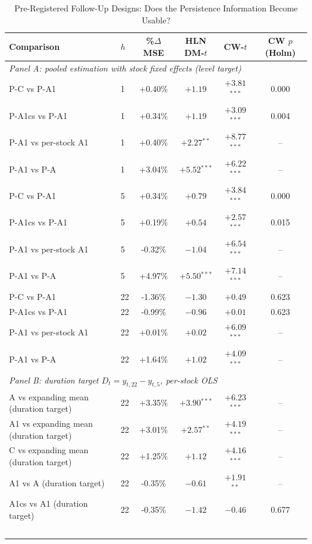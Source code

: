 
\begin{table}[htbp]
\centering
\caption{Pre-Registered Follow-Up Designs: Does the Persistence Information Become Usable?}
\label{tab:candidates}
\small
\begin{tabular}{llcccc}
\toprule
Comparison & $h$ & \%$\Delta$MSE & HLN DM-$t$ & CW-$t$ & CW $p$ (Holm) \\
\midrule
\multicolumn{6}{l}{\textit{Panel A: pooled estimation with stock fixed effects (level target)}} \\
P-C vs P-A1 & 1 & +0.40\% & $+1.19$ & $+3.81$$^{***}$ & 0.000 \\
P-A1cs vs P-A1 & 1 & +0.34\% & $+1.19$ & $+3.09$$^{***}$ & 0.004 \\
P-A1 vs per-stock A1 & 1 & +0.40\% & $+2.27$$^{**}$ & $+8.77$$^{***}$ & -- \\
P-A1 vs P-A & 1 & +3.04\% & $+5.52$$^{***}$ & $+6.22$$^{***}$ & -- \\
P-C vs P-A1 & 5 & +0.34\% & $+0.79$ & $+3.84$$^{***}$ & 0.000 \\
P-A1cs vs P-A1 & 5 & +0.19\% & $+0.54$ & $+2.57$$^{***}$ & 0.015 \\
P-A1 vs per-stock A1 & 5 & -0.32\% & $-1.04$ & $+6.54$$^{***}$ & -- \\
P-A1 vs P-A & 5 & +4.97\% & $+5.50$$^{***}$ & $+7.14$$^{***}$ & -- \\
P-C vs P-A1 & 22 & -1.36\% & $-1.30$ & $+0.49$ & 0.623 \\
P-A1cs vs P-A1 & 22 & -0.99\% & $-0.96$ & $+0.01$ & 0.623 \\
P-A1 vs per-stock A1 & 22 & +0.01\% & $+0.02$ & $+6.09$$^{***}$ & -- \\
P-A1 vs P-A & 22 & +1.64\% & $+1.02$ & $+4.09$$^{***}$ & -- \\
\midrule
\multicolumn{6}{l}{\textit{Panel B: duration target $D_t=y_{t,22}-y_{t,5}$, per-stock OLS}} \\
A vs expanding mean (duration target) & 22 & +3.35\% & $+3.90$$^{***}$ & $+6.23$$^{***}$ & -- \\
A1 vs expanding mean (duration target) & 22 & +3.01\% & $+2.57$$^{**}$ & $+4.19$$^{***}$ & -- \\
C vs expanding mean (duration target) & 22 & +1.25\% & $+1.12$ & $+4.16$$^{***}$ & -- \\
A1 vs A (duration target) & 22 & -0.35\% & $-0.61$ & $+1.91$$^{**}$ & -- \\
A1cs vs A1 (duration target) & 22 & -0.35\% & $-1.42$ & $-0.46$ & 0.677 \\
$$
\end{tabular}
\end{table}
